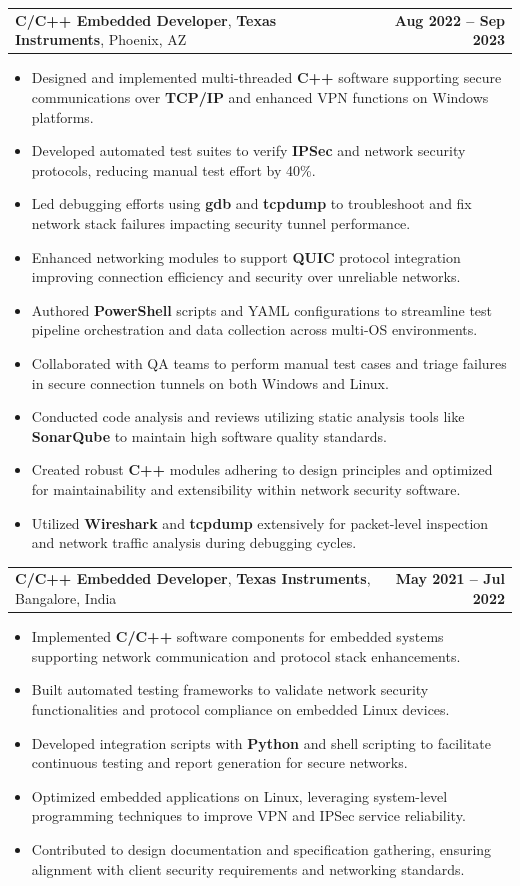 \documentclass[letterpaper,11pt]{article}
\makeatletter
\newcommand{\resumeItem}[1]{
  \item\footnotesize{
    {#1 \vspace{-2pt}}
  }
}
\newcommand{\resumeSubheading}[4]{
  \vspace{-2pt}\item
    \begin{tabular*}{1.0\textwidth}[t]{l@{\extracolsep{\fill}}r}
      \textbf{\fontsize{10pt}{14pt}\selectfont #3}, \textbf{\fontsize{10pt}{14pt}\selectfont #1}, \fontsize{10pt}{14pt}\selectfont #4 & \textbf{\fontsize{10pt}{14pt}\selectfont #2} \\
    \end{tabular*}\vspace{-7pt}
}
\newcommand{\resumeItemListStart}{\begin{itemize}[leftmargin=*]}
\newcommand{\resumeItemListEnd}{\end{itemize}\vspace{-5pt}}
\makeatother
\begin{document}
    \resumeSubheading
        {Texas Instruments}{Aug 2022 -- Sep 2023}
        {C/C++ Embedded Developer}{Phoenix, AZ}
      \resumeItemListStart
        \resumeItem{Designed and implemented multi-threaded \textbf{C++} software supporting secure communications over \textbf{TCP/IP} and enhanced VPN functions on Windows platforms.}
        \resumeItem{Developed automated test suites to verify \textbf{IPSec} and network security protocols, reducing manual test effort by 40\%.}
        \resumeItem{Led debugging efforts using \textbf{gdb} and \textbf{tcpdump} to troubleshoot and fix network stack failures impacting security tunnel performance.}
        \resumeItem{Enhanced networking modules to support \textbf{QUIC} protocol integration improving connection efficiency and security over unreliable networks.}
        \resumeItem{Authored \textbf{PowerShell} scripts and YAML configurations to streamline test pipeline orchestration and data collection across multi-OS environments.}
        \resumeItem{Collaborated with QA teams to perform manual test cases and triage failures in secure connection tunnels on both Windows and Linux.}
        \resumeItem{Conducted code analysis and reviews utilizing static analysis tools like \textbf{SonarQube} to maintain high software quality standards.}
        \resumeItem{Created robust \textbf{C++} modules adhering to design principles and optimized for maintainability and extensibility within network security software.}
        \resumeItem{Utilized \textbf{Wireshark} and \textbf{tcpdump} extensively for packet-level inspection and network traffic analysis during debugging cycles.}
      \resumeItemListEnd

    \resumeSubheading
        {Texas Instruments}{May 2021 -- Jul 2022}
        {C/C++ Embedded Developer}{Bangalore, India}
      \resumeItemListStart
        \resumeItem{Implemented \textbf{C/C++} software components for embedded systems supporting network communication and protocol stack enhancements.}
        \resumeItem{Built automated testing frameworks to validate network security functionalities and protocol compliance on embedded Linux devices.}
        \resumeItem{Developed integration scripts with \textbf{Python} and shell scripting to facilitate continuous testing and report generation for secure networks.}
        \resumeItem{Optimized embedded applications on Linux, leveraging system-level programming techniques to improve VPN and IPSec service reliability.}
        \resumeItem{Contributed to design documentation and specification gathering, ensuring alignment with client security requirements and networking standards.}
      \resumeItemListEnd
\end{document}
